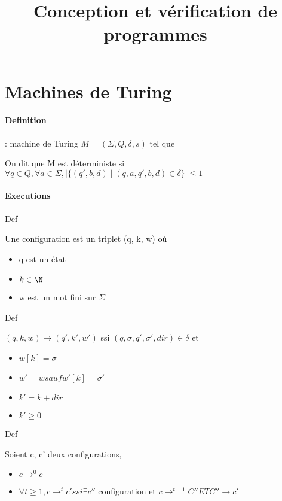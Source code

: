 \documentclass[10pt,a4paper]{article}
\title{Conception et vérification de programmes}
\begin{document}
\part{Machines de Turing}

\subsection{Definition} : machine de Turing $M = ( \Sigma , Q , \delta, s)$ tel que \begin{itemize}
\item $\Sigma$ : alphabet fini
\item Q : ensemble d'états fini non vide
\item $\delta \subseteq (Q \times \Sigma) \times (Q \cup \{yes \} \times \Sigma \times \{-1, 0, 1}$
\item $s \in Q$
\end{itemize}
On dit que M est déterministe si $\forall q \in Q, \forall a \in \Sigma, \mid \{ (q', b, d) \mid (q, a, q', b, d) \in \delta \} \mid \leq 1$

\subsection{Executions}
\subparagraph*{Def} Une configuration est un triplet (q, k, w) où \begin{itemize}
\item q est un état
\item $k \in \N$
\item w est un mot fini sur $\Sigma$
\end{itemize}

\subparagraph*{Def} $(q, k, w) \rightarrow (q', k', w')$ ssi $(q, \sigma, q', \sigma', dir) \in \delta$ et \begin{itemize}
\item $w[k] = \sigma$
\item $w' = w sauf w'[k] = \sigma'$
\item $k' = k + dir$
\item $k' \geq 0$
\end{itemize}

\subparagraph*{Def} Soient c, c' deux configurations, \begin{itemize}
\item $c \rightarrow^0 c$
\item $ \forall t \geq 1, c \rightarrow^t c' ssi \exists c''$ configuration et $c \rightarrow^{t-1}C'' ET C'' \rightarrow c'$
\end{itemize}
\end{document}
